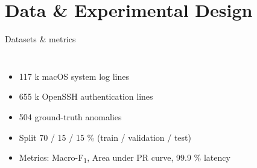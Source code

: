\documentclass[14pt,aspectratio=169,draft]{beamer}
\begin{document}
\section{Data \& Experimental Design}
\begin{frame}{Datasets \& metrics}
\begin{columns}
\begin{itemize}[<+->]
  \item 117 k macOS system log lines
  \item 655 k OpenSSH authentication lines
  \item 504 ground-truth anomalies
  \item Split 70 / 15 / 15 \% (train / validation / test)
  \item Metrics: Macro-F\textsubscript{1}, Area under PR curve, 99.9 \% latency
\end{itemize}

\centering
\begin{adjustbox}{max width=\linewidth}
\end{adjustbox}
\end{columns}
\end{frame}
\end{document}
